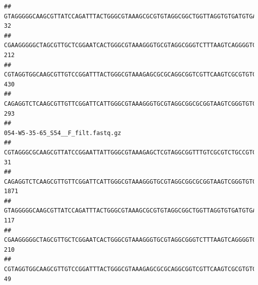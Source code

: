 \documentclass[]{article}
\begin{document}
\begin{verbatim}
## GTAGGGGGCAAGCGTTATCCAGATTTACTGGGCGTAAAGCGCGTGTAGGCGGCTGGTTAGGTGTGATGTGAAATCTTCCGGCTCAACCGGAAAACTGCATTGCAAACCGGCCTGGCTAGAGTGCAGGAGAGGGAAGCGGAATTCCAGGTGTAGCGGTGAAATGCGTAGATATCTGGAGGAACACCAGTGGCGAAGGCGGCTTCCTGGCCTGCAACTGACGCTGAGACGCGAAAGCGTGGGGAGCGAAC                                32
## CGAAGGGGGCTAGCGTTGCTCGGAATCACTGGGCGTAAAGGGTGCGTAGGCGGGTCTTTAAGTCAGGGGTGAAATCCTGGAGCTCAACTCCAGAACTGCCTTTGATACTGAAGATCTTGAGTTCGGGAGAGGTGAGTGGAACTGCGAGTGTAGAGGTGAAATTCGTAGATATTCGCAAGAACACCAGTGGCGAAGGCGGCTCACTGGCCCGATACTGACGCTGAGGCACGAAAGCGTGGGGAGCAAACA                              212
## CGTAGGTGGCAAGCGTTGTCCGGATTTACTGGGCGTAAAGAGCGCGCAGGCGGTCGTTCAAGTCGCGTGTGAAAGCCCCCGGCTCAACTGGGGAGGGTCACGCGATACTGATCGACTCGAAGGCAGGAGAGGGTAGTGGAATTCCCGGTGTAGTGGTGAAATGCGTAGATATCGGGAGGAACACCAGTGGCGAAGGCGACTACCTGGCCTGTTCTTGACGCTGAGGCGCGAAAGCTAGGGGAGCAAACG                              430
## CAGAGGTCTCAAGCGTTGTTCGGATTCATTGGGCGTAAAGGGTGCGTAGGCGGCGCGGTAAGTCGGGTGTGAAATCTCGGGGCTTAACTCCGAAACTGCATTCGATACTGCCGTGCTTGAGGACTGGAGAGGAGACTGGAATTTACGGTGTAGCGGTGAAATGCGTAGATATCGTAAGGAAGACCAGTGGCGAAGGCGGGTCTCTGGACAGTTCCTGACGCTGAGGCACGAAGGCCAGGGGAGCAAACG                              293
##                                                                                                                                                                                                                                                           054-W5-35-65_S54__F_filt.fastq.gz
## CGTAGGGCGCAAGCGTTATCCGGAATTATTGGGCGTAAAGAGCTCGTAGGCGGTTTGTCGCGTCTGCCGTGAAAGTCCGGGGCTCAACTCCGGATCTGCGGTGGGTACGGGCAGACTAGAGTGATGTAGGGGAGACTGGAATTCCTGGTGTAGCGGTGAAATGCGCAGATATCAGGAGGAACACCGATGGCGAAGGCAGGTCTCTGGGCATTAACTGACGCTGAGGAGCGAAAGCATGGGGAGCGAACA                                31
## CAGAGGTCTCAAGCGTTGTTCGGATTCATTGGGCGTAAAGGGTGCGTAGGCGGCGCGGTAAGTCGGGTGTGAAATCTCGGAGCTTAACTCCGAAACTGCATTCGATACTGCCGTGCTTGAGGACTGGAGAGGAGACTGGAATTTACGGTGTAGCGGTGAAATGCGTAGATATCGTAAGGAAGACCAGTGGCGAAGGCGGGTCTCTGGACAGTTCCTGACGCTGAGGCACGAAGGCCAGGGGAGCAAACG                              1871
## GTAGGGGGCAAGCGTTATCCAGATTTACTGGGCGTAAAGCGCGTGTAGGCGGCTGGTTAGGTGTGATGTGAAATCTTCCGGCTCAACCGGAAAACTGCATTGCAAACCGGCCTGGCTAGAGTGCAGGAGAGGGAAGCGGAATTCCAGGTGTAGCGGTGAAATGCGTAGATATCTGGAGGAACACCAGTGGCGAAGGCGGCTTCCTGGCCTGCAACTGACGCTGAGACGCGAAAGCGTGGGGAGCGAAC                                117
## CGAAGGGGGCTAGCGTTGCTCGGAATCACTGGGCGTAAAGGGTGCGTAGGCGGGTCTTTAAGTCAGGGGTGAAATCCTGGAGCTCAACTCCAGAACTGCCTTTGATACTGAAGATCTTGAGTTCGGGAGAGGTGAGTGGAACTGCGAGTGTAGAGGTGAAATTCGTAGATATTCGCAAGAACACCAGTGGCGAAGGCGGCTCACTGGCCCGATACTGACGCTGAGGCACGAAAGCGTGGGGAGCAAACA                               210
## CGTAGGTGGCAAGCGTTGTCCGGATTTACTGGGCGTAAAGAGCGCGCAGGCGGTCGTTCAAGTCGCGTGTGAAAGCCCCCGGCTCAACTGGGGAGGGTCACGCGATACTGATCGACTCGAAGGCAGGAGAGGGTAGTGGAATTCCCGGTGTAGTGGTGAAATGCGTAGATATCGGGAGGAACACCAGTGGCGAAGGCGACTACCTGGCCTGTTCTTGACGCTGAGGCGCGAAAGCTAGGGGAGCAAACG                                49

\end{verbatim}
\end{document}
